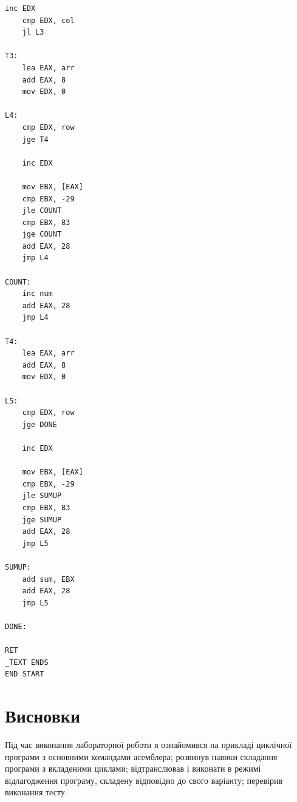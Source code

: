 \documentclass{article}
\begin{document}
\begin{normalsize}
\begin{lstlisting}[language={[x86masm]Assembler}]
	inc EDX   
	cmp EDX, col
	jl L3

T3:     
	lea EAX, arr  
	add EAX, 8
	mov EDX, 0

L4:
	cmp EDX, row 
	jge T4
	
	inc EDX
	
	mov EBX, [EAX] 
	cmp EBX, -29
	jle COUNT
	cmp EBX, 83 
	jge COUNT
	add EAX, 28
	jmp L4

COUNT:
	inc num
	add EAX, 28
	jmp L4

T4:
	lea EAX, arr  
	add EAX, 8
	mov EDX, 0

L5:
	cmp EDX, row  
	jge DONE
	
	inc EDX
	
	mov EBX, [EAX]  
	cmp EBX, -29
	jle SUMUP
	cmp EBX, 83 
	jge SUMUP
	add EAX, 28
	jmp L5

SUMUP:
	add sum, EBX
	add EAX, 28
	jmp L5

DONE:

RET
_TEXT ENDS 
END START
	\end{lstlisting}

	\section*{Висновки}
	Під час виконання лабораторної роботи я ознайомився на прикладі циклічної програми з основними командами асемблера; розвинув навики складання програми з вкладеними циклами; відтранслював і виконати в режимі відлагодження програму, складену відповідно до свого варіанту; перевірив виконання тесту.
	    
\end{normalsize}
\end{document}
